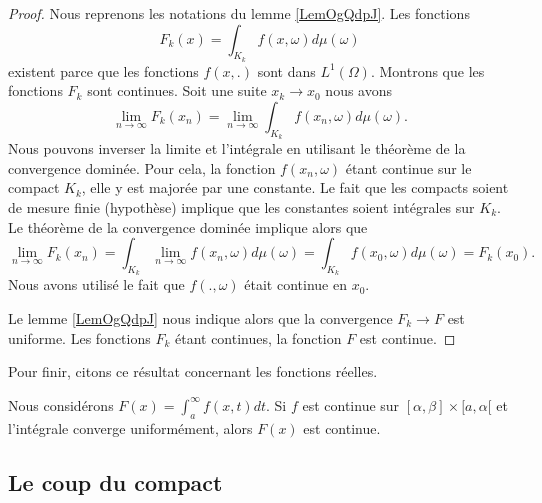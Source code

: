 \begin{proof}
    Nous reprenons les notations du lemme \ref{LemOgQdpJ}. Les fonctions
    \begin{equation}
        F_k(x)=\int_{K_k}f(x,\omega)d\mu(\omega)
    \end{equation}
    existent parce que les fonctions \( f(x,.)\) sont dans \( L^1(\Omega)\). Montrons que les fonctions \( F_k\) sont continues. Soit une suite \( x_k\to x_0\) nous avons
    \begin{equation}
        \lim_{n\to \infty} F_k(x_n)=\lim_{n\to \infty} \int_{K_k}f(x_n,\omega)d\mu(\omega).
    \end{equation}
    Nous pouvons inverser la limite et l'intégrale en utilisant le théorème de la convergence dominée. Pour cela, la fonction \( f(x_n,\omega)\) étant continue sur le compact \( K_k\), elle y est majorée par une constante. Le fait que les compacts soient de mesure finie (hypothèse) implique que les constantes soient intégrales sur \( K_k\). Le théorème de la convergence dominée implique alors que
    \begin{equation}
        \lim_{n\to \infty} F_k(x_n)=\int_{K_k}\lim_{n\to \infty} f(x_n,\omega)d\mu(\omega)=\int_{K_k}f(x_0,\omega)d\mu(\omega)=F_k(x_0).
    \end{equation}
    Nous avons utilisé le fait que \( f(.,\omega)\) était continue en \( x_0\).

    Le lemme \ref{LemOgQdpJ} nous indique alors que la convergence \( F_k\to F\) est uniforme. Les fonctions \( F_k\) étant continues, la fonction \( F\) est continue.
\end{proof}

Pour finir, citons ce résultat concernant les fonctions réelles.
\begin{theorem}		\label{ThoInDerrtCvUnifFContinue}
    Nous considérons \( F(x)=\int_a^{\infty}f(x,t)dt\). Si \( f\) est continue sur $[\alpha,\beta]\times[a,\alpha[$ et l'intégrale converge uniformément, alors $F(x)$ est continue.
\end{theorem}

\subsection{Le coup du compact}

